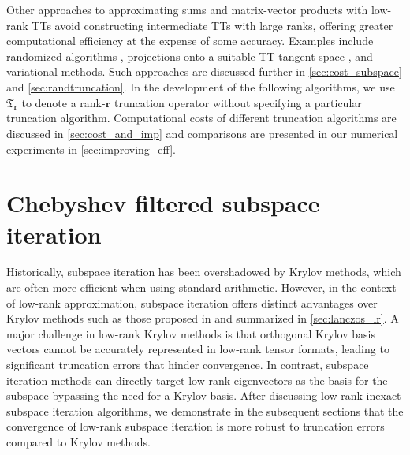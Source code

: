\documentclass[10pt,preprint]{elsarticle}
\begin{document}
Other approaches to approximating sums and matrix-vector products with low-rank TTs avoid constructing intermediate TTs with large ranks, offering greater computational efficiency at the expense of some accuracy. Examples include randomized algorithms \cite{al2023randomized}, projections onto a suitable TT tangent space \cite[Section 4.3]{Steinlechner2016}, and variational methods. Such approaches are discussed further in \cref{sec:cost_subspace} and \cref{sec:randtruncation}. 
%
%
In the development of the following algorithms, we use $\mathfrak{T}_{\bm r}$ to denote a rank-$\bm r$ truncation operator without specifying a particular truncation algorithm. Computational costs of different truncation algorithms are discussed in \cref{sec:cost_and_imp} and comparisons are presented in our numerical experiments in \cref{sec:improving_eff}.


\section{Chebyshev filtered subspace iteration}
\label{sec:chebfsi}
Historically, subspace iteration has been overshadowed by Krylov methods, which are often more efficient when using standard arithmetic. However, in the context of low-rank approximation, subspace iteration offers distinct advantages over Krylov methods such as those proposed in \cite{MPS_Lanczos,kressner2010krylov,kressner2011,Palitta2021} and summarized in \cref{sec:lanczos_lr}. A major challenge in low-rank Krylov methods is that orthogonal Krylov basis vectors cannot be accurately represented in low-rank tensor formats, leading to significant truncation errors that hinder convergence. In contrast, subspace iteration methods can directly target low-rank eigenvectors as the basis for the subspace
bypassing the need for a Krylov basis. After discussing low-rank inexact subspace iteration algorithms, we demonstrate in the subsequent sections that the convergence of low-rank subspace iteration is more robust to truncation errors compared to Krylov methods. 
\end{document}
